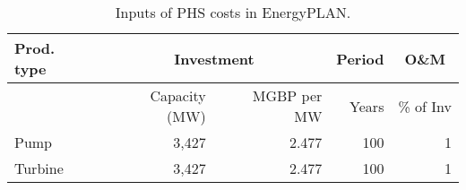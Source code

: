 \begin{table}[htbp]
	\caption{Inputs of PHS costs in EnergyPLAN.}
	\label{tbl:EP_PHS_costs_partial}
	\centering
	\begin{tabular}{@{}lrrrr@{}}
		\toprule
		Prod. type & \multicolumn{2}{c}{Investment} & \multicolumn{1}{c}{Period} & \multicolumn{1}{c}{O\&M} \\ \midrule
		& Capacity (MW) & MGBP per MW & Years & \% of Inv \\
		Pump & 3,427 & 2.477 & 100 & 1 \\
		Turbine & 3,427 & 2.477 & 100 & 1 \\ \bottomrule
	\end{tabular}
\end{table}